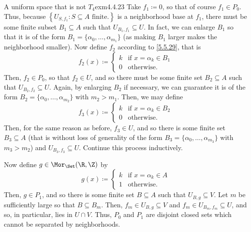 \begin{exm}{A uniform space that is not $T_4$}{exm4.4.23}
Take $f_1\coloneqq 0$, so that of course $f_1\in P_0$.  Thus, because $\left\{ U_{S,f_1}:S\subseteq A\text{ finite.}\right\}$ is a neighborhood base at $f_1$, there must be some finite subset $B_1\subseteq A$ such that $U_{B_1,f_1}\subseteq U$.  In fact, we can enlarge $B_1$ so that it is of the form $B_1=\{ \alpha _0,\ldots ,\alpha _{m_1}\}$ (as making $B_1$ larger makes the neighborhood smaller).  Now define $f_2$ according to \eqref{5.5.29}, that is
\begin{equation}
f_2(x)\coloneqq \begin{cases}k & \text{if }x=\alpha _k\in B_1 \\ 0 & \text{otherwise.}\end{cases}
\end{equation}
Then, $f_2\in P_0$, so that $f_2\in U$, and so there must be some finite set $B_2\subseteq A$ such that $U_{B_2,f_2}\subseteq U$.  Again, by enlarging $B_2$ if necessary, we can guarantee it is of the form $B_2=\{ \alpha _0,\ldots ,\alpha _{m_2}\}$ with $m_2>m_1$.  Then, we may define
\begin{equation}
f_3(x)\coloneqq \begin{cases}k & \text{if }x=\alpha _k\in B_2 \\ 0 & \text{otherwise.}\end{cases}
\end{equation}
Then, for the same reason as before, $f_3\in U$, and so there is some finite set $B_3\subseteq A$ (that is without loss of generality of the form $B_3=\{ \alpha _0,\ldots ,\alpha _{m_3}\}$ with $m_3>m_2$) and $U_{B_3,f_3}\subseteq U$.  Continue this process inductively.

Now define $g\in \Mor _{\Set}(\R ,\Z )$ by
\begin{equation}
g(x)\coloneqq \begin{cases}k & \text{if }x=\alpha _k\in A \\ 1 & \text{otherwise.}\end{cases}
\end{equation}
Then, $g\in P_1$, and so there is some finite set $B\subseteq A$ such that $U_{B,g}\subseteq V$.  Let $m$ be sufficiently large so that $B\subseteq B_m$.  Then, $f_m\in U_{B,g}\subseteq V$ and $f_m\in U_{B_m,f_m}\subseteq U$, and so, in particular, lies in $U\cap V$.  Thus, $P_0$ and $P_1$ are disjoint closed sets which cannot be separated by neighborhoods.


\end{exm}
